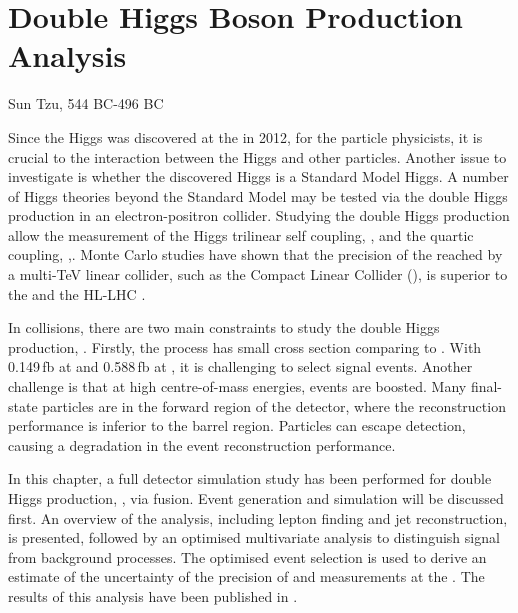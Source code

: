 \chapter{Double Higgs Boson Production Analysis}
\label{chap:DoubleHiggs}

%
{Sun Tzu, 544 BC-496 BC}%


Since the Higgs was discovered at the \LHC in 2012\cite{Aad:2012tfa,Chatrchyan:2012ufa}, for the particle physicists, it is crucial to the interaction between the Higgs and other particles. Another issue to investigate is whether the discovered Higgs is a Standard Model Higgs. A number of Higgs theories beyond the Standard Model may be tested via the double Higgs production in an electron-positron collider. Studying the double Higgs production allow the measurement of the Higgs trilinear self coupling, \gHHH, and the quartic coupling, \gWWHH,. Monte Carlo studies have shown that the precision of the \gHHH reached by a multi-TeV linear collider, such as the Compact Linear Collider (\CLIC), is superior to the \LHC and the HL-LHC  \cite{Contino:2013gna}.


In \ee collisions, there are two main constraints to study the double Higgs production,  \eeToHH. Firstly, the process has small cross section comparing to . With 0.149\,fb at  and 0.588\,fb at , it is challenging to select signal events. Another challenge is that at high centre-of-mass energies, events are boosted.  Many final-state particles are in the forward region of the detector, where the reconstruction performance is inferior to the barrel region.  Particles can escape detection, causing a degradation in the event reconstruction performance.


In this chapter, a full \CLICILD detector simulation study has been performed for double Higgs production, \eeToHH, via \WW fusion. Event generation and simulation will be discussed first. An overview of the analysis, including lepton finding and jet reconstruction, is presented, followed by an optimised multivariate analysis to distinguish signal from background processes. The optimised event selection is used to derive an estimate of the uncertainty of the precision of \gHHH and \gWWHH measurements at the \CLIC. The results of this analysis have been published in \cite{Abramowicz:2016zbo}.

